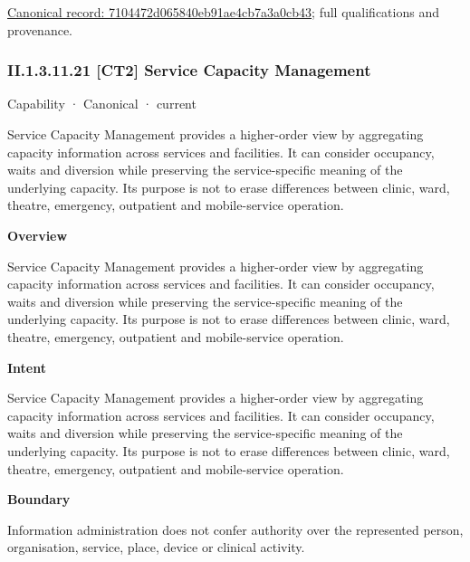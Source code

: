 {\footnotesize \href{../../../../continuum/strategy/capability/feature/7104472d065840eb91ae4cb7a3a0cb43.md}{Canonical record: 7104472d065840eb91ae4cb7a3a0cb43}; full qualifications and provenance.}\par
\subsubsection*{II.1.3.11.21 [CT2] Service Capacity Management}
\label{navigation:II.1.3.11.21}

\label{element:d86105bf9c86445394088f65c895d37f}
{\small Capability · Canonical · current}\par

Service Capacity Management provides a higher-order view by aggregating capacity information across services and facilities. It can consider occupancy, waits and diversion while preserving the service-specific meaning of the underlying capacity. Its purpose is not to erase differences between clinic, ward, theatre, emergency, outpatient and mobile-service operation.



\textbf{Overview}



Service Capacity Management provides a higher-order view by aggregating capacity information across services and facilities. It can consider occupancy, waits and diversion while preserving the service-specific meaning of the underlying capacity. Its purpose is not to erase differences between clinic, ward, theatre, emergency, outpatient and mobile-service operation.



\textbf{Intent}



Service Capacity Management provides a higher-order view by aggregating capacity information across services and facilities. It can consider occupancy, waits and diversion while preserving the service-specific meaning of the underlying capacity. Its purpose is not to erase differences between clinic, ward, theatre, emergency, outpatient and mobile-service operation.



\textbf{Boundary}



Information administration does not confer authority over the represented person, organisation, service, place, device or clinical activity.



